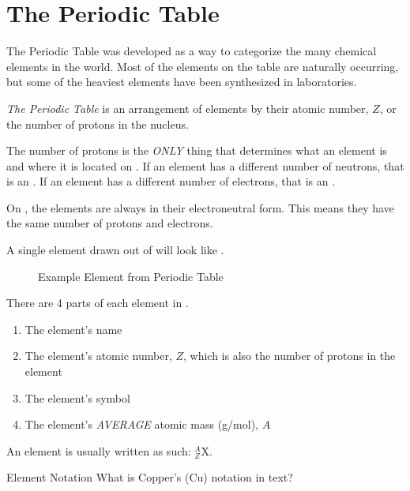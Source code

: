 \section{The Periodic Table} \label{sec:Periodic Table}
The Periodic Table was developed as a way to categorize the many chemical elements in the world.
Most of the elements on the table are naturally occurring, but some of the heaviest elements have been synthesized in laboratories.

\begin{definition} \label{def:Periodic Table}
  \emph{The Periodic Table} is an arrangement of elements by their atomic number, $Z$, or the number of protons in the nucleus.
  \begin{remark}
    The number of protons is the \emph{ONLY} thing that determines what an element is and where it is located on .
    If an element has a different number of neutrons, that is an .
    If an element has a different number of electrons, that is an .
  \end{remark}
  \begin{remark}
    On , the elements are always in their electroneutral form.
    This means they have the same number of protons and electrons.
  \end{remark}
\end{definition}

A single element drawn out of  will look like \figurename.
\begin{figure}[h!]
  \caption{Example Element from Periodic Table}
  \label{fig:Single Element Periodic Table}
\end{figure}

There are 4 parts of each element in .
\begin{enumerate}
  \item The element's name
  \item The element's atomic number, $Z$, which is also the number of protons in the element
  \item The element's symbol
  \item The element's \emph{AVERAGE} atomic mass (\si{\gram / \mole}), $A$
\end{enumerate}
An element is usually written as such: $_{Z}^{A}\mathrm{X}$.
\begin{example}[]{Element Notation}
  What is Copper's (Cu) notation in text?
  
  \tcblower
  
\end{example}

